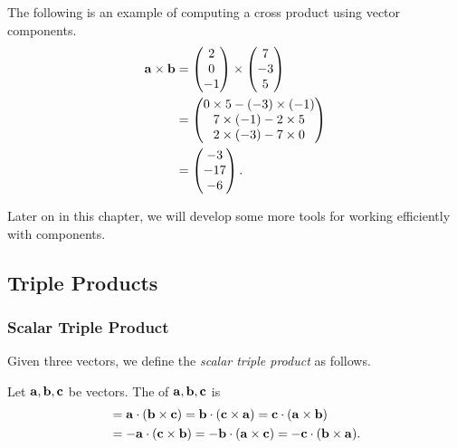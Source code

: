 \documentclass[a4paper]{scrartcl}
\begin{document}
\begin{example}
    The following is an example of computing a cross product using vector components.
    \begin{align*}
        \mathbf{a} \times \mathbf{b} &= \begin{pmatrix}2 \\ 0 \\ -1\end{pmatrix}\times\begin{pmatrix}7 \\ -3 \\ 5\end{pmatrix} \\
        &= \begin{pmatrix}
            0 \times 5 - (-3) \times (-1) \\
            7 \times (-1) - 2 \times 5 \\
            2 \times (-3) - 7 \times 0
        \end{pmatrix} \\
        &= \begin{pmatrix}
            -3 \\ -17 \\ -6
        \end{pmatrix}.
    \end{align*}
\end{example}


Later on in this chapter, we will develop some more tools for working efficiently with components.

\subsection{Triple Products}

\subsubsection{Scalar Triple Product}

Given three vectors, we define the \emph{scalar triple product} as follows.

\begin{definition}
    Let $\mathbf{a}, \mathbf{b}, \mathbf{c}$ be vectors. The  of $\mathbf{a}, \mathbf{b}, \mathbf{c}$ is
    \begin{align*}
        [\vv{a}, \vv{b}, \vv{c}] &= \vv{a} \cdot ( \vv{b} \times \vv{c}) =  \vv{b} \cdot ( \vv{c} \times \vv{a}) =  \vv{c} \cdot ( \vv{a} \times \vv{b}) \\
    &= - \vv{a} \cdot ( \vv{c} \times \vv{b}) =  -\vv{b} \cdot ( \vv{a} \times \vv{c}) =  -\vv{c} \cdot ( \vv{b} \times \vv{a}).
    \end{align*}
\end{definition}
\end{document}

